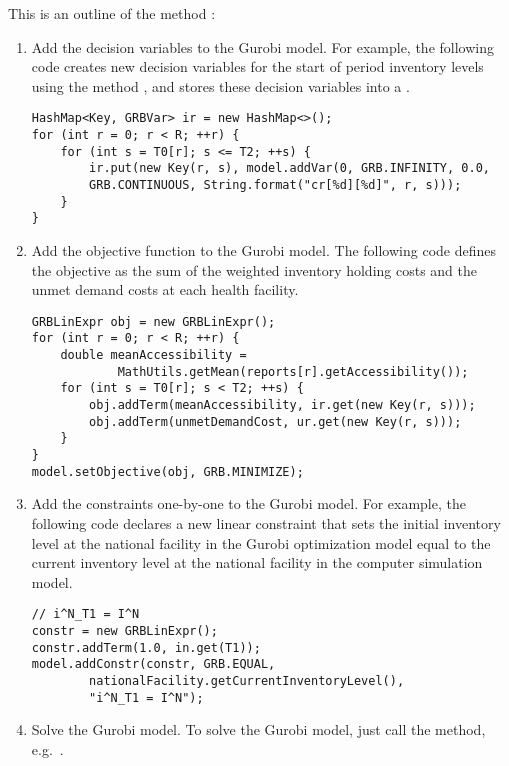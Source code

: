 This is an outline of the method :
\begin{enumerate}
\item Add the decision variables to the Gurobi model.
For example, the following code creates new decision variables
for the start of period inventory levels
using the method ,
and stores these decision variables into a .
\begin{lstlisting}
HashMap<Key, GRBVar> ir = new HashMap<>();
for (int r = 0; r < R; ++r) {
    for (int s = T0[r]; s <= T2; ++s) {
        ir.put(new Key(r, s), model.addVar(0, GRB.INFINITY, 0.0,
        GRB.CONTINUOUS, String.format("cr[%d][%d]", r, s)));
    }
}
\end{lstlisting}

\item Add the objective function to the Gurobi model.
The following code defines the objective as the sum of
the weighted inventory holding costs and the unmet demand costs
at each health facility.
\begin{lstlisting}
GRBLinExpr obj = new GRBLinExpr();
for (int r = 0; r < R; ++r) {
    double meanAccessibility = 
            MathUtils.getMean(reports[r].getAccessibility()); 
    for (int s = T0[r]; s < T2; ++s) {
        obj.addTerm(meanAccessibility, ir.get(new Key(r, s)));
        obj.addTerm(unmetDemandCost, ur.get(new Key(r, s)));
    }
}
model.setObjective(obj, GRB.MINIMIZE);
\end{lstlisting}

\item Add the constraints one-by-one to the Gurobi model.
For example, the following code declares a new linear constraint
that sets the initial inventory level at the national facility
in the Gurobi optimization model
equal to the current inventory level at the national facility
in the computer simulation model.
\begin{lstlisting}
// i^N_T1 = I^N
constr = new GRBLinExpr();
constr.addTerm(1.0, in.get(T1));
model.addConstr(constr, GRB.EQUAL,
        nationalFacility.getCurrentInventoryLevel(),
        "i^N_T1 = I^N");
\end{lstlisting}

\item Solve the Gurobi model.
To solve the Gurobi model, just call the  method,
e.g.\ .


\end{enumerate}
